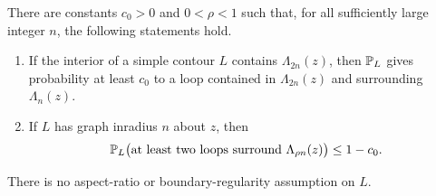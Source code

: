 \begin{proposition}\label{prop:loop-estimates}
There are constants $c_0>0$ and $0<\rho<1$ such that, for all sufficiently
large integer $n$, the following statements hold.
\begin{enumerate}[label=(\roman*)]
\item If the interior of a simple contour $L$ contains $\Lambda_{2n}(z)$,
then $\mathbb P_L$ gives probability at least $c_0$ to a loop contained in
$\Lambda_{2n}(z)$ and surrounding $\Lambda_n(z)$.
\item If $L$ has graph inradius $n$ about $z$, then
\begin{equation}\label{eq:upper-loop-estimate}
 \mathbb P_L\bigl(\text{at least two loops surround }\Lambda_{\rho n}(z)\bigr)
 \le 1-c_0.
\end{equation}
\end{enumerate}
There is no aspect-ratio or boundary-regularity assumption on $L$.
\end{proposition}
